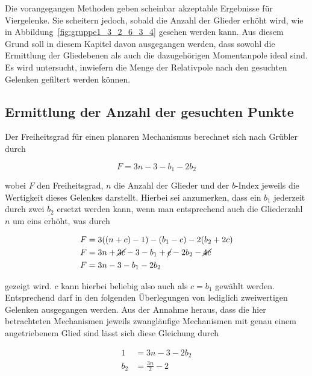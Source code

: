 Die vorangegangen Methoden geben scheinbar akzeptable Ergebnisse für Viergelenke.
Sie scheitern jedoch, sobald die Anzahl der Glieder erhöht wird, wie in Abbildung~\ref{fig:gruppe1_3_2_6_3_4} gesehen werden kann.
Aus diesem Grund soll in diesem Kapitel davon ausgegangen werden, dass sowohl die Ermittlung der Gliedebenen als auch die dazugehörigen Momentanpole ideal sind.
Es wird untersucht, inwiefern die Menge der Relativpole nach den gesuchten Gelenken gefiltert werden können.

\subsection{Ermittlung der Anzahl der gesuchten Punkte}

Der Freiheitsgrad für einen planaren Mechanismus berechnet sich nach Grübler durch~\cite{Goessner2016}

\begin{equation}
    F = 3n - 3 - b_1 - 2b_2
    \label{eq:gruebler}
\end{equation}

wobei $F$ den Freiheitsgrad, $n$ die Anzahl der Glieder und der $b$-Index jeweils die Wertigkeit dieses Gelenkes darstellt.
Hierbei sei anzumerken, dass ein $b_1$ jederzeit durch zwei $b_2$ ersetzt werden kann, wenn man entsprechend auch die Gliederzahl $n$ um eins erhöht, was durch

\begin{equation}
    \begin{split}
        F &= 3((n+c)-1) - (b_1 - c) - 2(b_2 + 2c) \\
        F &= 3n + \cancel{3c} - 3 - b_1 + \cancel{c} - 2b_2 - \cancel{4c} \\
        F &= 3n - 3 - b_1 - 2b_2
    \end{split}
\end{equation}

gezeigt wird.
$c$ kann hierbei beliebig also auch als $c = b_1$ gewählt werden.
Entsprechend darf in den folgenden Überlegungen von lediglich zweiwertigen Gelenken ausgegangen werden.
Aus der Annahme heraus, dass die hier betrachteten Mechanismen jeweils zwangläufige Mechanismen mit genau einem angetriebenem Glied sind lässt sich diese Gleichung durch

\begin{equation}
    \begin{split}
        1 &= 3n - 3 - 2b_2 \\
        b_2 &= \frac{3n}{2} - 2
    \end{split}
\end{equation}

